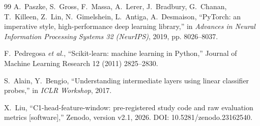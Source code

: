 \documentclass[review,12pt]{elsarticle}
\begin{document}
\begin{thebibliography}{99}
A.~Paszke, S.~Gross, F.~Massa, A.~Lerer, J.~Bradbury, G.~Chanan,
T.~Killeen, Z.~Lin, N.~Gimelshein, L.~Antiga, A.~Desmaison,
``PyTorch: an imperative style, high-performance deep learning library,''
in \emph{Advances in Neural Information Processing Systems 32 (NeurIPS)},
2019, pp. 8026--8037.

F.~Pedregosa \emph{et al.}, ``Scikit-learn: machine learning in Python,''
Journal of Machine Learning Research 12 (2011) 2825--2830.

S.~Alain, Y.~Bengio, ``Understanding intermediate layers using linear
classifier probes,'' in \emph{ICLR Workshop}, 2017.

X.~Liu, ``C1-head-feature-window: pre-registered study code and raw
evaluation metrics [software],'' Zenodo, version v2.1, 2026.
DOI: 10.5281/zenodo.23162540.

\end{thebibliography}
\end{document}
